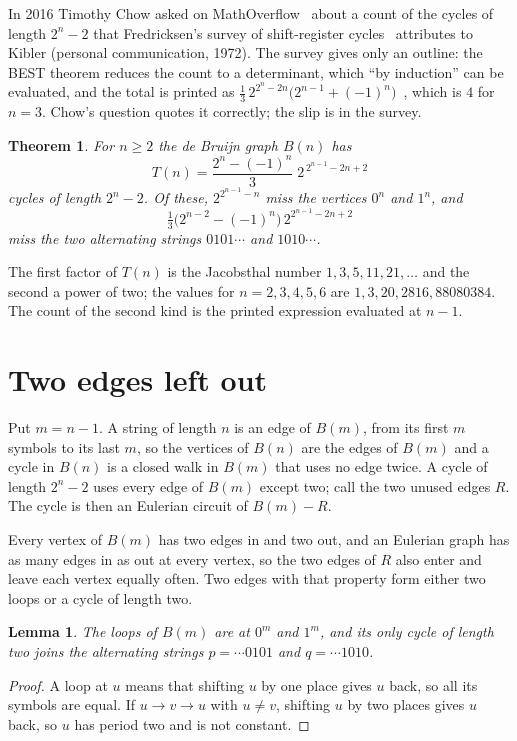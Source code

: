 \documentclass[11pt]{article}
\newtheorem{theorem}{Theorem}
\newtheorem{lemma}{Lemma}
\theoremstyle{remark}
\begin{document}
In 2016 Timothy Chow asked on MathOverflow~\cite{MO} about a count of the cycles of length $2^n-2$ that
Fredricksen's survey of shift-register cycles~\cite[Section~2c]{F82} attributes to Kibler (personal
communication, 1972). The survey gives only an outline: the BEST theorem reduces the count to a determinant,
which ``by induction'' can be evaluated, and the total is printed as
$\tfrac13\,2^{2^n-2n}\bigl(2^{n-1}+(-1)^n\bigr)$~\cite[p.~203]{F82}, which is $4$ for $n=3$. Chow's
question quotes it correctly; the slip is in the survey.

\begin{theorem}\label{thm:main}
For $n\ge2$ the de Bruijn graph $B(n)$ has
\[
T(n)=\frac{2^n-(-1)^n}{3}\;2^{\,2^{n-1}-2n+2}
\]
cycles of length $2^n-2$. Of these, $2^{2^{n-1}-n}$ miss the vertices $0^n$ and $1^n$, and
\[
\tfrac13\bigl(2^{n-2}-(-1)^n\bigr)\,2^{2^{n-1}-2n+2}
\]
miss the two alternating strings $0101\cdots$ and $1010\cdots$.
\end{theorem}

The first factor of $T(n)$ is the Jacobsthal number $1,3,5,11,21,\dots$ and the second a power of two; the
values for $n=2,3,4,5,6$ are $1,3,20,2816,88080384$. The count of the second kind is the printed expression
evaluated at $n-1$.

\section{Two edges left out}

Put $m=n-1$. A string of length $n$ is an edge of $B(m)$, from its first $m$ symbols to its last $m$, so the
vertices of $B(n)$ are the edges of $B(m)$ and a cycle in $B(n)$ is a closed walk in $B(m)$ that uses no edge
twice. A cycle of length $2^n-2$ uses every edge of $B(m)$ except two; call the two unused edges $R$. The
cycle is then an Eulerian circuit of $B(m)-R$.

Every vertex of $B(m)$ has two edges in and two out, and an Eulerian graph has as many edges in as out at
every vertex, so the two edges of $R$ also enter and leave each vertex equally often. Two edges with that property form either two loops or a cycle of
length two.

\begin{lemma}\label{lem:two}
The loops of $B(m)$ are at $0^m$ and $1^m$, and its only cycle of length two joins the alternating strings
$p=\cdots0101$ and $q=\cdots1010$.
\end{lemma}

\begin{proof}
A loop at $u$ means that shifting $u$ by one place gives $u$ back, so all its symbols are equal. If $u\to v\to
u$ with $u\ne v$, shifting $u$ by two places gives $u$ back, so $u$ has period two and is not constant.
\end{proof}
\end{document}
